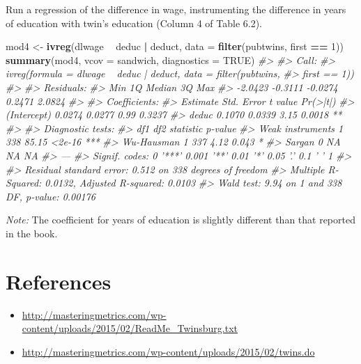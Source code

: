 \documentclass[]{book}
\newenvironment{Shaded}{\begin{snugshade}}{\end{snugshade}}
\newcommand{\KeywordTok}[1]{\textcolor[rgb]{0.13,0.29,0.53}{\textbf{#1}}}
\newcommand{\DataTypeTok}[1]{\textcolor[rgb]{0.13,0.29,0.53}{#1}}
\newcommand{\DecValTok}[1]{\textcolor[rgb]{0.00,0.00,0.81}{#1}}
\newcommand{\StringTok}[1]{\textcolor[rgb]{0.31,0.60,0.02}{#1}}
\newcommand{\CommentTok}[1]{\textcolor[rgb]{0.56,0.35,0.01}{\textit{#1}}}
\newcommand{\OtherTok}[1]{\textcolor[rgb]{0.56,0.35,0.01}{#1}}
\newcommand{\OperatorTok}[1]{\textcolor[rgb]{0.81,0.36,0.00}{\textbf{#1}}}
\newcommand{\NormalTok}[1]{#1}
\providecommand{\tightlist}{%
  \setlength{\itemsep}{0pt}\setlength{\parskip}{0pt}}
\theoremstyle{definition}
\theoremstyle{definition}
\theoremstyle{definition}
\theoremstyle{remark}
\begin{document}
Run a regression of the difference in wage, instrumenting the difference
in years of education with twin's education (Column 4 of Table 6.2).

\begin{Shaded}
\begin{Highlighting}[]
\NormalTok{mod4 <-}\StringTok{ }\KeywordTok{ivreg}\NormalTok{(dlwage }\OperatorTok{~}\StringTok{ }\NormalTok{deduc }\OperatorTok{|}\StringTok{ }\NormalTok{deduct,}
              \DataTypeTok{data =} \KeywordTok{filter}\NormalTok{(pubtwins, first }\OperatorTok{==}\StringTok{ }\DecValTok{1}\NormalTok{))}
\KeywordTok{summary}\NormalTok{(mod4, }\DataTypeTok{vcov =}\NormalTok{ sandwich, }\DataTypeTok{diagnostics =} \OtherTok{TRUE}\NormalTok{)}
\CommentTok{#> }
\CommentTok{#> Call:}
\CommentTok{#> ivreg(formula = dlwage ~ deduc | deduct, data = filter(pubtwins, }
\CommentTok{#>     first == 1))}
\CommentTok{#> }
\CommentTok{#> Residuals:}
\CommentTok{#>     Min      1Q  Median      3Q     Max }
\CommentTok{#> -2.0423 -0.3111 -0.0274  0.2471  2.0824 }
\CommentTok{#> }
\CommentTok{#> Coefficients:}
\CommentTok{#>             Estimate Std. Error t value Pr(>|t|)   }
\CommentTok{#> (Intercept)   0.0274     0.0277    0.99   0.3237   }
\CommentTok{#> deduc         0.1070     0.0339    3.15   0.0018 **}
\CommentTok{#> }
\CommentTok{#> Diagnostic tests:}
\CommentTok{#>                  df1 df2 statistic p-value    }
\CommentTok{#> Weak instruments   1 338     85.15  <2e-16 ***}
\CommentTok{#> Wu-Hausman         1 337      4.12   0.043 *  }
\CommentTok{#> Sargan             0  NA        NA      NA    }
\CommentTok{#> ---}
\CommentTok{#> Signif. codes:  0 '***' 0.001 '**' 0.01 '*' 0.05 '.' 0.1 ' ' 1}
\CommentTok{#> }
\CommentTok{#> Residual standard error: 0.512 on 338 degrees of freedom}
\CommentTok{#> Multiple R-Squared: 0.0132,  Adjusted R-squared: 0.0103 }
\CommentTok{#> Wald test: 9.94 on 1 and 338 DF,  p-value: 0.00176}
\end{Highlighting}
\end{Shaded}

\emph{Note:} The coefficient for years of education is slightly
different than that reported in the book.

\section*{References}\label{references-6}

\begin{itemize}
\tightlist
\item
  \url{http://masteringmetrics.com/wp-content/uploads/2015/02/ReadMe_Twinsburg.txt}
\item
  \url{http://masteringmetrics.com/wp-content/uploads/2015/02/twins.do}
\end{itemize}
\end{document}
